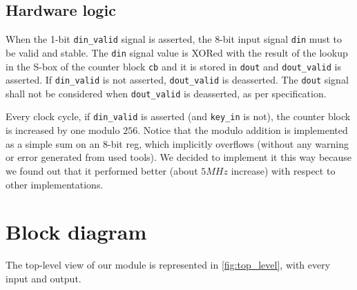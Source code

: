 \subsection{Hardware logic}
When the 1-bit \lstinline{din_valid} signal is asserted, the 8-bit input signal \lstinline{din} must to be valid and stable. The \lstinline{din} signal value is XORed with the result of the lookup in the S-box of the counter block \lstinline{cb} and it is stored in \lstinline{dout} and \lstinline{dout_valid} is asserted. If \lstinline{din_valid} is not asserted, \lstinline{dout_valid} is deasserted. The \lstinline{dout} signal shall not be considered when \lstinline{dout_valid} is deasserted, as per specification.

Every clock cycle, if \lstinline{din_valid} is asserted (and \lstinline{key_in} is not), the counter block is increased by one modulo $256$. Notice that the modulo addition is implemented as a simple sum on an 8-bit reg, which implicitly overflows (without any warning or error generated from used tools). We decided to implement it this way because we found out that it performed better (about $5 MHz$ increase) with respect to other implementations.

\clearpage
\section{Block diagram}
The top-level view of our module is represented in \cref{fig:top_level}, with every input and output.

